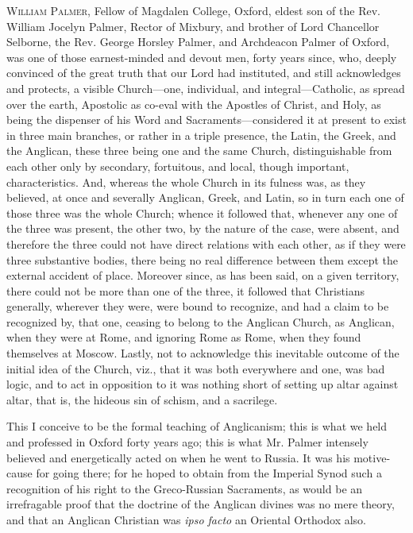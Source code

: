 

W\textsc{illiam} P\textsc{almer},
Fellow of Magdalen College, Oxford, eldest son of the Rev. William
Jocelyn Palmer, Rector of Mixbury, and brother of Lord Chancellor
Selborne, the Rev. George Horsley Palmer, and Archdeacon Palmer of
Oxford, was one of those earnest-minded and devout men, forty years
since, who, deeply convinced of the great truth that our Lord had
instituted, and still acknowledges and protects, a visible
Church—one, individual, and integral—Catholic, as spread over the
earth, Apostolic as co-eval with the Apostles of Christ, and Holy, as
being the dispenser of his Word and Sacraments—considered it at
present to exist in three main branches, or rather in a triple
presence, the Latin, the Greek, and the Anglican, these three
being one and the same Church, distinguishable from each other only by
secondary, fortuitous, and local, though important, characteristics.
And, whereas the whole Church in its fulness was, as they believed, at
once and severally Anglican, Greek, and Latin, so in turn each one of
those three was the whole Church; whence it followed that, whenever
any one of the three was present, the other two, by the nature of the
case, were absent, and therefore the three could not have direct
relations with each other, as if they were three substantive bodies,
there being no real difference between them except the external
accident of place. Moreover since, as has been said, on a given
territory, there could not be more than one of the three, it followed
that Christians generally, wherever they were, were bound to
recognize, and had a claim to be recognized by, that one, ceasing to
belong to the Anglican Church, as Anglican, when they were at Rome,
and ignoring Rome as Rome, when they found themselves at Moscow.
Lastly, not to acknowledge this inevitable outcome of the initial idea
of the Church, viz., that it was both everywhere and one, was bad
logic, and to act in opposition to it was nothing short of setting up
altar against altar, that is, the hideous sin of schism, and a
sacrilege.

This I conceive to be the formal teaching of
Anglicanism; this is what we held and professed in Oxford forty years
ago; this is what Mr. Palmer intensely believed and energetically
acted on when he went to Russia. It was his motive-cause for going
there; for he hoped to obtain from the Imperial Synod such a
recognition of his right to the Greco-Russian Sacraments, as would be
an irrefragable proof that the doctrine of the Anglican divines was no
mere theory, and that an Anglican Christian was \emph{ipso facto} an
Oriental Orthodox also.

